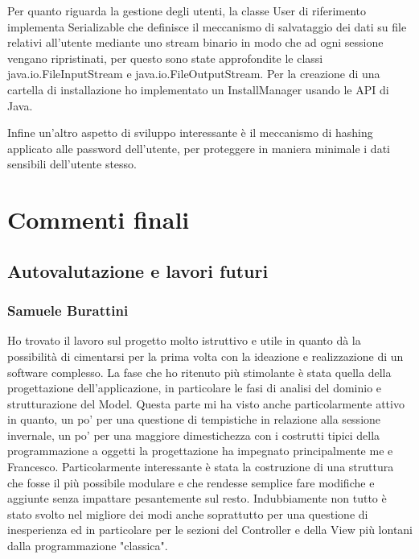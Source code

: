 \documentclass[a4paper,12pt]{report}
\begin{document}
Per quanto riguarda la gestione degli utenti, la classe User di riferimento implementa Serializable che definisce il meccanismo di salvataggio dei dati su file relativi all'utente mediante uno stream binario in modo che ad ogni sessione vengano ripristinati, per questo sono state approfondite le classi java.io.FileInputStream e java.io.FileOutputStream.
Per la creazione di una cartella di installazione ho implementato un InstallManager usando le API di Java.

Infine un'altro aspetto di sviluppo interessante è il meccanismo di hashing applicato alle password dell'utente, per proteggere in maniera minimale i dati sensibili dell'utente stesso.




\chapter{Commenti finali}

\section{Autovalutazione e lavori futuri}


\subsection*{Samuele Burattini}
Ho trovato il lavoro sul progetto molto istruttivo e utile in quanto dà la possibilità di cimentarsi per la prima volta con la ideazione e realizzazione di un software complesso. La fase che ho ritenuto più stimolante è stata quella della progettazione dell'applicazione, in particolare le fasi di analisi del dominio e strutturazione del Model. Questa parte mi ha visto anche particolarmente attivo in quanto, un po' per una questione di tempistiche in relazione alla sessione invernale, un po' per una maggiore dimestichezza con i costrutti tipici della programmazione a oggetti la progettazione ha impegnato principalmente me e Francesco.
Particolarmente interessante è stata la costruzione di una struttura che fosse il più possibile modulare e che rendesse semplice fare modifiche e aggiunte senza impattare pesantemente sul resto. Indubbiamente non tutto è stato svolto nel migliore dei modi anche soprattutto per una questione di inesperienza ed in particolare per le sezioni del Controller e della View più lontani dalla programmazione "classica".
\end{document}
